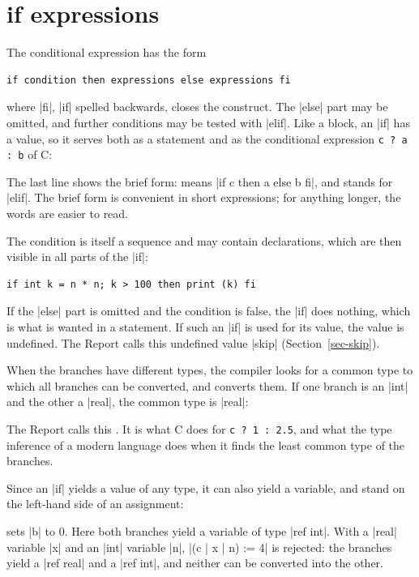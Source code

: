 \section{\textbf{if} expressions}\label{sec-if}

The conditional expression has the form
\begin{lstlisting}
if condition then expressions else expressions fi
\end{lstlisting}
where \code|fi|, \code|if| spelled backwards, closes the construct. The
\code|else| part may be omitted, and further conditions may be tested
with \code|elif|. Like a block, an \code|if| has a value, so it serves
both as a statement and as the conditional expression \texttt{c ? a : b}
of C:


The last line shows the brief form:  means
\code|if c then a else b fi|, and \code{|:} stands for \code|elif|. The
brief form is convenient in short expressions; for anything longer, the
words are easier to read.

The condition is itself a sequence and may contain declarations, which are
then visible in all parts of the \code|if|:
\begin{lstlisting}
if int k = n * n; k > 100 then print (k) fi
\end{lstlisting}

If the \code|else| part is omitted and the condition is false, the
\code|if| does nothing, which is what is wanted in a statement. If such
an \code|if| is used for its value, the value is undefined. The Report
calls this undefined value \code|skip| (Section~\ref{sec-skip}).

When the branches have different types, the compiler looks for a common
type to which all branches can be converted, and converts them. If
one branch is an \code|int| and the other a \code|real|, the common type is
\code|real|:


The Report calls this . It is what C does for
\texttt{c ? 1 : 2.5}, and what the type inference of a modern language
does when it finds the least common type of the branches.

Since an \code|if| yields a value of any type, it can also yield a
variable, and stand on the left-hand side of an assignment:


\noindent sets \code|b| to 0. Here both branches yield a variable of
type \code|ref int|. With a \code|real| variable \code|x| and an
\code|int| variable \code|n|, \code|(c | x | n) := 4| is rejected: the
branches yield a \code|ref real| and a \code|ref int|, and neither can be
converted into the other.

